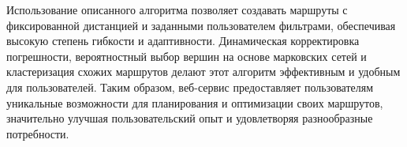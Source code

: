 Использование описанного алгоритма позволяет создавать маршруты с фиксированной дистанцией и заданными пользователем фильтрами, обеспечивая высокую степень гибкости и адаптивности. Динамическая корректировка погрешности, вероятностный выбор вершин на основе марковских сетей и кластеризация схожих маршрутов делают этот алгоритм эффективным и удобным для пользователей. Таким образом, веб-сервис предоставляет пользователям уникальные возможности для планирования и оптимизации своих маршрутов, значительно улучшая пользовательский опыт и удовлетворяя разнообразные потребности.





